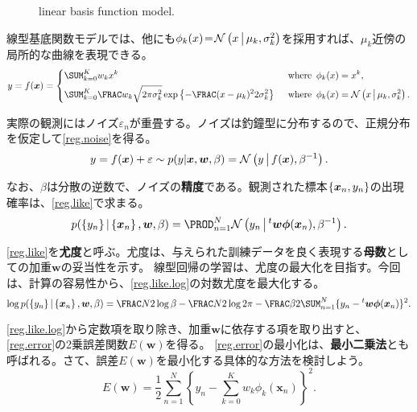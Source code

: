 \documentclass[10pt,a4paper]{book}
\begin{document}
\begin{figure}[h]
\centering
{}
\caption{linear basis function model.\label{fig:reg.cubic}}
\end{figure}

線型基底関数モデルでは、他にも$\phi_k(x)\!=\!\mathcal{N}\left(x\,\middle|\,\mu_k,\sigma_k^2\right)$を採用すれば、$\mu_k$近傍の局所的な曲線を表現できる。
%
\begin{equation}
y = f(\bm{x}) = \left\{
\begin{aligned}
&\sum_{k=0}^K w_k x^k&
&\where \phi_k(x)=x^k,\\
&\sum_{k=0}^K \frac{w_k}{\sqrt{2\pi\sigma_k^2}}\exp\left\{-\frac{(x-\mu_k)^2}{2\sigma_k^2}\right\}&
&\where \phi_k(x)=\Nd{x}{\mu_k,\sigma_k^2}.
\end{aligned}
\right.
\end{equation}

実際の観測にはノイズ$\varepsilon_n$が重畳する。ノイズは釣鐘型に分布するので、正規分布を仮定して\eqref{reg.noise}を得る。
%
\begin{equation}
\label{eq:reg.noise}
y = f(\bm{x}) + \varepsilon \sim p(y|\bm{x},\bm{w},\beta) = \mathcal{N}\left(y\,\middle|\,f(\bm{x}),\beta^{-1}\right).
\end{equation}

なお、$\beta$は分散の逆数で、ノイズの\textbf{精度}である。観測された標本$\seq{\bm{x}_n,y_n}$の出現確率は、\eqref{reg.like}で求まる。
%
\begin{equation}
\label{eq:reg.like}
p(\seq{y_n}|\seq{\bm{x}_n},\bm{w},\beta) = \prod_{n=1}^N \Nd{y_n}{\trans{\bm{w}}\bm{\phi}(\bm{x}_n), \beta^{-1}}.
\end{equation}

\eqref{reg.like}を\textbf{尤度}と呼ぶ。尤度は、与えられた訓練データを良く表現する\textbf{母数}としての加重$\bm{w}$の妥当性を示す。
線型回帰の学習は、尤度の最大化を目指す。今回は、計算の容易性から、\eqref{reg.like.log}の対数尤度を最大化する。
%
\begin{equation}
\label{eq:reg.like.log}
\log p(\seq{y_n}|\seq{\bm{x}_n},\bm{w},\beta)
= \frac{N}{2}\log\beta - \frac{N}{2}\log2\pi - \frac{\beta}{2}\sum_{n=1}^N\{y_n-\trans{\bm{w}}\bm{\phi}(\bm{x}_n)\}^2.
\end{equation}

\eqref{reg.like.log}から定数項を取り除き、加重$\bm{w}$に依存する項を取り出すと、\eqref{reg.error}の2乗誤差関数$E(\bm{w})$を得る。
\eqref{reg.error}の最小化は、\textbf{最小二乗法}とも呼ばれる。さて、誤差$E(\bm{w})$を最小化する具体的な方法を検討しよう。
%
\begin{equation}
\label{eq:reg.error}
E(\bm{w}) = \frac{1}{2} \sum_{n=1}^N \left\{y_n - \sum_{k=0}^K w_k \phi_k(\bm{x}_n)\right\}^2.
\end{equation}
\end{document}
